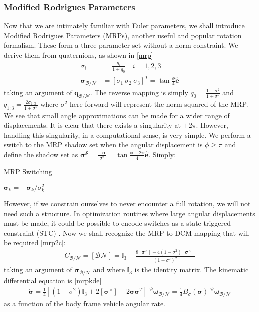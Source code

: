 \subsubsection{Modified Rodrigues Parameters}
Now that we are intimately familiar with Euler parameters, we shall introduce Modified Rodrigues Parameters (MRPs), another useful and popular rotation formalism. These form a three parameter set without a norm constraint. We derive them from quaternions, as shown in \ref{mrp}
%
\begin{align}
\label{mrp}
	\sigma_i &= \frac{q_i}{1+q_0} \quad i = 1,2,3 \\
	\boldsymbol{\sigma}_\mathcal{B/N} &= [\sigma_1 \ \sigma_2 \ \sigma_3]^T = \tan\frac{\phi}{4}\hat{\bm{e}}
\end{align}
taking an argument of $\bm{q}_\mathcal{B/N}$. The reverse mapping is simply $q_0 = \frac{1-\sigma^2}{1+\sigma^2}$ and $q_{1:3} = \frac{2\sigma_{1:3}}{1+\sigma^2}$ where $\sigma^2$ here forward will represent the norm squared of the MRP. We see that small angle approximations can be made for a wider range of displacements. It is clear that there exists a singularity at $\pm 2\pi$. However, handling this singularity, in a computational sense, is very simple. We perform a switch to the MRP shadow set when the angular displacement is $\phi \geq \pi$ and define the shadow set as $\boldsymbol{\sigma}^\mathcal{S} = \frac{-\boldsymbol{\sigma}}{\sigma^2} = \tan{\frac{\phi-2\pi}{4}}\hat{\bm{e}}$. Simply: 

\begin{algorithm}
\caption{MRP Switching}\label{mrpswitch}
\begin{algorithmic}[1]
\State $\boldsymbol{\sigma}_{k} = -{\boldsymbol{\sigma}_{k}}/{\sigma_k^2}$
\EndIf 
\EndProcedure
\end{algorithmic}
\end{algorithm}

However, if we constrain ourselves to never encounter a full rotation, we will not need such a structure. In optimization routines where large angular displacements must be made, it could be possible to encode switches as a state triggered constraint (STC) \cite{szmuk2019successive}. Now we shall recognize the MRP-to-DCM mapping that will be required \ref{mrp2c}:
\begin{align}
\label{mrp2c}
	C_{\mathcal{B/N}} = [\mathcal{BN}]= \mathbb{I}_3 +  \frac{8[\boldsymbol{\sigma}^\times] - 4(1-\sigma^2)[\boldsymbol{\sigma}^\times]}{(1+\sigma^2)^2}
\end{align}
taking an argument of $\boldsymbol{\sigma}_\mathcal{B/N}$ and where $\mathbb{I}_3$ is the identity matrix. The kinematic differential equation is \ref{mrpkde}
%
\begin{align}
\label{mrpkde}
	\dot{\boldsymbol{\sigma}} = \frac{1}{4}[(1-\sigma^2)\mathbb{I}_3 +  2[\boldsymbol{\sigma}^\times] + 2\boldsymbol{\sigma}\boldsymbol{\sigma}^T] \ ^\mathcal{B}\boldsymbol{\omega}_\mathcal{B/N} = \frac{1}{4}B_\sigma(\boldsymbol{\sigma}) \ ^\mathcal{B}\boldsymbol{\omega}_\mathcal{B/N}
\end{align}
as a function of the body frame vehicle angular rate.

